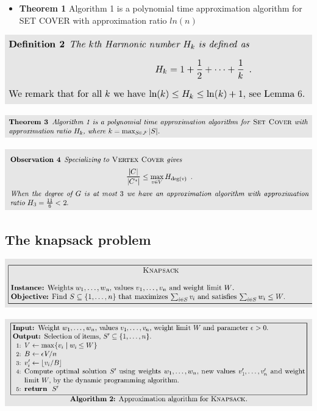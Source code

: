 \documentclass[11pt]{article}
\begin{document}
\begin{itemize}
\item \textbf{Theorem 1} Algorithm 1 is a polynomial time approximation algorithm for SET COVER with approximation ratio \(ln(n)\)
\end{itemize}

\begin{center}
\includegraphics[width=.9\linewidth]{Approximation Algorithms/screenshot_2019-04-28_09-10-12.png}
\end{center}

\begin{center}
\includegraphics[width=.9\linewidth]{Approximation Algorithms/screenshot_2019-04-28_09-10-34.png}
\end{center}

\begin{center}
\includegraphics[width=.9\linewidth]{Approximation Algorithms/screenshot_2019-04-28_09-17-51.png}
\end{center}

\subsection{The knapsack problem}
\label{sec:org9f9bffb}
\begin{center}
\includegraphics[width=.9\linewidth]{Approximation Algorithms/screenshot_2019-04-28_09-21-37.png}
\end{center}

\begin{center}
\includegraphics[width=.9\linewidth]{Approximation Algorithms/screenshot_2019-04-28_09-23-38.png}
\end{center}
\end{document}
